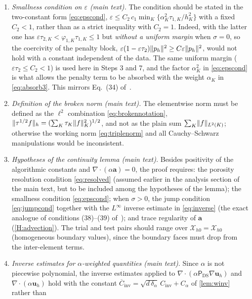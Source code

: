 \documentclass[11pt,a4paper]{article}
\newcommand{\ba}{\boldsymbol{a}}
\newcommand{\buh}{\boldsymbol{u}_h}
\newcommand{\ViscProj}{\mathsf{P}_{\mathrm{DS}}}
\newcommand{\Xh}{\mathcal{X}_{h0}}
\newcommand{\Cinv}{C_{\mathrm{inv}}}
\newcommand{\Cinva}{\overline{C}_{\mathrm{inv}}}
\DeclarePairedDelimiter{\norm}{\lVert}{\rVert}
\theoremstyle{plain}
\theoremstyle{remark}
\theoremstyle{definition}
\numberwithin{equation}{section}
\begin{document}
\begin{enumerate}[label=\textup{(A\arabic*)},leftmargin=3.2em,itemsep=2pt]
\item\label{am:eps}
\emph{Smallness condition on $\varepsilon$ (main text).} The condition should be stated
in the two-constant form \eqref{eq:epscond},
$\varepsilon\le C_2\,c_1\min_K\{\alpha_K^2\tau_{1,K}/h_K^2\}$ with a fixed $C_2<1$,
rather than as a strict inequality with $C_2=1$. Indeed, with the latter one has
$\varepsilon\tau_{2,K}<\varphi_{1,K}\tau_{1,K}\le1$ but \emph{without a uniform margin}
when $\sigma=0$, so the coercivity of the penalty block,
$\varepsilon(1-\varepsilon\tau_2)\norm{p_h}^2\ge C\varepsilon\norm{p_h}^2$, would not
hold with a constant independent of the data. The same uniform margin
($\varepsilon\tau_2\le C_2<1$) is used here in Steps 3 and 7, and the factor
$\alpha_K^2$ in \eqref{eq:epscond} is what allows the penalty term to be absorbed with
the weight $\alpha_K$ in \eqref{eq:absorb3}. This mirrors Eq.~(34)
of~\cite{codina2001}.
\item\label{am:brokennorm}
\emph{Definition of the broken norm (main text).}
The elementwise norm must be defined as the $\ell^2$ combination
\eqref{eq:brokennotation}, $\norm{\tau^{1/2}f}_h=(\sum_K\tau_K\norm{f}_K^2)^{1/2}$, and
not as the plain sum $\sum_K\norm{f}_{L^2(K)}$; otherwise the working norm
\eqref{eq:triplenorm} and all Cauchy--Schwarz manipulations would be inconsistent.
\item\label{am:hypotheses}
\emph{Hypotheses of the continuity lemma (main text).} Besides positivity of the
algorithmic constants and $\nabla\cdot(\alpha\ba)=0$, the proof requires: the porosity
resolution condition \eqref{eq:resolved} (assumed earlier in the analysis section of the
main text, but to be included among the hypotheses of the lemma); the smallness condition
\eqref{eq:epscond}; when $\sigma>0$, the jump condition \eqref{eq:jumpcond} together with
the $L^\infty$ inverse estimate in \eqref{eq:inverse} (the exact analogue of conditions
(38)--(39) of~\cite{codina2001}); and trace regularity of $\ba$ (\cref{H:advection}).
The trial and test pairs should range over $\Xh=\mathcal{X}_{h0}$ (homogeneous boundary
values), since the boundary faces must drop from the inter-element terms.
\item\label{am:winv}
\emph{Inverse estimates for $\alpha$-weighted quantities (main text).} Since $\alpha$ is
not piecewise polynomial, the inverse estimates applied to
$\nabla\cdot(\alpha\ViscProj\nabla\buh)$ and $\nabla\cdot(\alpha\buh)$ hold with the
constant $\Cinva=\sqrt{d\,\delta_\alpha}\,\Cinv+C_\alpha$ of \cref{lem:winv} rather than

\end{enumerate}
\end{document}
